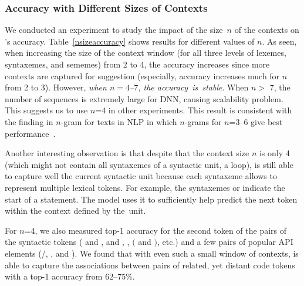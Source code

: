 \subsubsection{Accuracy with Different Sizes of Contexts}



We conducted an experiment to study the impact of the size~$n$ of the
contexts on {\tool}'s accuracy. Table~\ref{nsizeaccuracy} shows
results for different values of $n$. As seen, when increasing the size
of the context window (for all three levels of lexemes, syntaxemes,
and sememes) from 2 to 4, the accuracy increases since more contexts
are captured for suggestion (especially, accuracy increases much for
$n$ from 2 to 3). However, {\em when $n=4$--$7$, the
accuracy~is~stable}. When $n > $ 7, the number of sequences is
extremely large for DNN, causing scalability problem.  This suggests
us to use $n$=4 in other experiments.
%
This result is consistent with the finding in $n$-gram for texts in
NLP in which $n$-grams for $n$=3--6 give best
performance~\cite{jurafsky14}.
%

Another interesting observation is that despite that the context size
$n$ is only 4 (which might not contain all syntaxemes of a syntactic
unit, \eg a  loop), {\tool} is still able to capture well
the current syntactic unit because each syntaxeme allows {\tool} to
represent multiple lexical tokens.
For example, the syntaxemes  or  indicate the
start of a  statement. The model uses it to sufficiently
help predict the next token within the context defined by the~unit.



For $n$=4, we also measured top-1 accuracy for the second token of the
pairs of the syntactic tokens (\eg {}
and ,  and ,
, $($ and $)$, etc.) and a few pairs of popular API elements
(\eg {}/,
, and
).  We
found that with even such a small window of contexts, {\tool} is able
to capture the associations between pairs of related, yet distant code
tokens with a top-1 accuracy from 62--75\%. 






